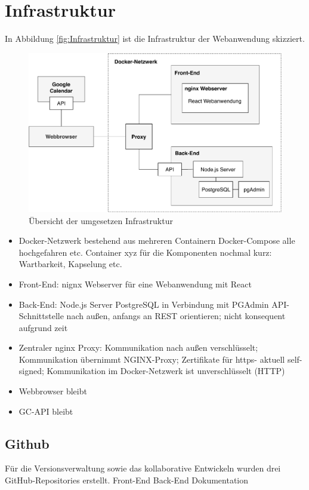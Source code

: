 \section{Infrastruktur}
In Abbildung \vref{fig:Infrastruktur} ist die Infrastruktur der Webanwendung skizziert.

\begin{figure}[H]
	\centering 
	\includegraphics[width=\textwidth]{img/ImplementierungInfrastruktur.pdf}
	\caption[Übersicht der umgesetzen Infrastruktur]{\label{fig:Infrastruktur}Übersicht der umgesetzen Infrastruktur}
\end{figure}

\begin{itemize}
	\item Docker-Netzwerk bestehend aus mehreren Containern
		\subitem Docker-Compose alle hochgefahren etc.
		\subitem Container xyz für die Komponenten
		\subitem nochmal kurz: Wartbarkeit, Kapselung etc.
	\item Front-End: nignx Webserver für eine Webanwendung mit React 
	\item Back-End: 
		\subitem Node.js Server
		\subitem PostgreSQL in Verbindung mit PGAdmin 
		\subitem API-Schnittstelle nach außen, anfangs an REST orientieren; nicht konsequent aufgrund zeit
	\item Zentraler nginx Proxy: Kommunikation nach außen verschlüsselt; Kommunikation übernimmt NGINX-Proxy; Zertifikate für https- aktuell self-signed; Kommunikation im Docker-Netzwerk ist unverschlüsselt (HTTP)
	\item Webbrowser bleibt
	\item GC-API bleibt
\end{itemize}

\subsection{Github}
Für die Versionsverwaltung sowie das kollaborative Entwickeln wurden drei GitHub-Repositories erstellt. 
Front-End 
Back-End 
Dokumentation